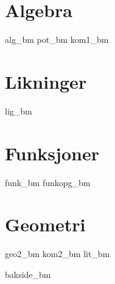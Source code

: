 \chapter{Algebra}
\newpage
{alg_bm}
{pot_bm}
\newpage
{kom1_bm}

\chapter{Likninger \label{Likningar}}
\newpage
{lig_bm}

\chapter{Funksjoner \label{Funksjoner}}
{funk_bm}
\opgt
{funkopg_bm}

\chapter{Geometri}
\newpage
{geo2_bm}
\newpage
{kom2_bm}
{lit_bm}
{\printindex {}
	}
{bakside_bm}

















